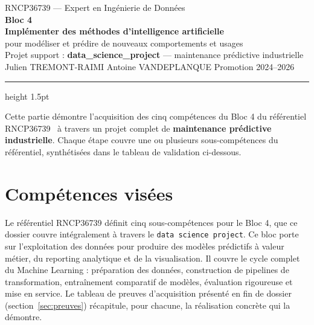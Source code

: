 \documentclass[11pt]{article}
\begin{document}
\thispagestyle{fancy}
\begin{center}
  \vspace*{0.3cm}
  {\small\textcolor{black!55}{RNCP36739 --- Expert en Ingénierie de Données}}\\[6pt]
  {\Huge\bfseries\textcolor{titleNavy}{Bloc 4}}\\[6pt]
  {\large\bfseries Implémenter des méthodes d'intelligence artificielle}\\[2pt]
  {\large pour modéliser et prédire de nouveaux comportements et usages}\\[10pt]
  {\normalsize Projet support : \textbf{data\_science\_project} --- maintenance prédictive industrielle}\\[4pt]
  {\small Julien TREMONT-RAIMI \quad\textbullet\quad Antoine VANDEPLANQUE \quad\textbullet\quad Promotion 2024--2026}
\end{center}

\vspace{4pt}
{\color{titleNavy}\hrule height 1.5pt}
\vspace{10pt}

Cette partie démontre l'acquisition des cinq compétences du Bloc 4 du référentiel
RNCP36739~\cite{rncp} à travers un projet complet de \textbf{maintenance prédictive
industrielle}. Chaque étape couvre une ou plusieurs sous-compétences du référentiel, 
synthétisées dans le tableau de validation ci-dessous.

\section{Compétences visées}

Le référentiel RNCP36739 définit cinq sous-compétences pour le Bloc 4, que ce
dossier couvre intégralement à travers le \texttt{data science project}.
Ce bloc porte sur l'exploitation des données pour produire des modèles prédictifs
à valeur métier, du reporting analytique et de la visualisation. Il couvre le cycle
complet du Machine Learning : préparation des données, construction de pipelines de
transformation, entraînement comparatif de modèles, évaluation rigoureuse et mise
en service. Le tableau de preuves d'acquisition présenté en fin de dossier
(section~\ref{sec:preuves}) récapitule, pour chacune, la réalisation concrète qui
la démontre.
\end{document}
